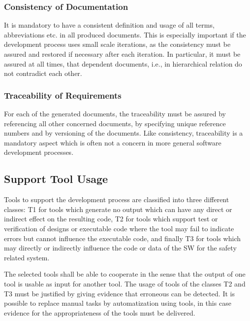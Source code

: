 \subsubsection{Consistency of Documentation}
\label{sec:cons-docum}

It is mandatory to have a consistent definition and usage of all terms,
abbreviations etc. in all produced documents. This is especially important if
the development process uses small scale iterations, as the consistency must be
assured and restored if necessary after each iteration. In particular, it must
be assured at all times, that dependent documents, i.e., in hierarchical
relation do not contradict each other.

\subsubsection{Traceability of Requirements}
\label{sec:trac-requ}

For each of the generated documents, the traceability must be assured by
referencing all other concerned documents, by specifying unique reference
numbers and by versioning of the documents. Like consistency, traceability is a
mandatory aspect which is often not a concern in more general software
development processes.

\subsection{Support Tool Usage}
\label{sec:tool-usage}

Tools to support the development process are classified into three different
classes: T1 for tools which generate no output which can have any direct or
indirect effect on the resulting code, T2 for tools which support test or
verification of designs or executable code where the tool may fail to indicate
errors but cannot influence the executable code, and finally T3 for tools which
may directly or indirectly influence the code or data of the SW for the safety
related system.

The selected tools shall be able to cooperate in the sense that the output of
one tool is usable as input for another tool. The usage of tools of the classes
T2 and T3 must be justified by giving evidence that erroneous can be
detected. It is possible to replace manual tasks by automatization using tools,
in this case evidence for the appropriateness of the tools must be delivered.


